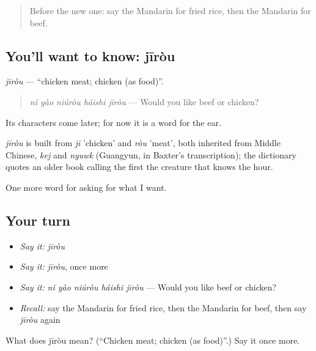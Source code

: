 \label{lesson:ZH-C161-jirou}



\begin{quote}
Before the new one: say the Mandarin for fried rice, then the Mandarin for beef.
\end{quote}

\subsection*{You'll want to know: jīròu}
\emph{jīròu} — \textquotedblleft{}chicken meat; chicken (as food)\textquotedblright{}.

\begin{quote}
\emph{nǐ yào niúròu háishi jīròu} — Would you like beef or chicken?
\end{quote}

Its characters come later; for now it is a word for the ear.

\begin{cousinweb}
\emph{jīròu} is built from \emph{jī} 'chicken' and \emph{ròu} 'meat', both inherited from Middle Chinese, \emph{kej} and \emph{nyuwk} (Guangyun, in Baxter's transcription); the dictionary quotes an older book calling the first the creature that knows the hour.
\end{cousinweb}

\begin{grammarlens}[title={What you've built}]
One more word for asking for what I want.
\end{grammarlens}

\subsection*{Your turn}
\begin{itemize}
\raggedright
  \item \emph{Say it:} \emph{jīròu}
  \item \emph{Say it:} \emph{jīròu}, once more
  \item \emph{Say it:} \emph{nǐ yào niúròu háishi jīròu} — Would you like beef or chicken?
  \item \emph{Recall:} say the Mandarin for fried rice, then the Mandarin for beef, then say \emph{jīròu} again
\end{itemize}

\begin{tcolorbox}[breakable,colback=teal!4,colframe=teal!35!black,title={Before you move on}]
What does jīròu mean? (\textquotedblleft{}Chicken meat; chicken (as food)\textquotedblright{}.) Say it once more.
\end{tcolorbox}
